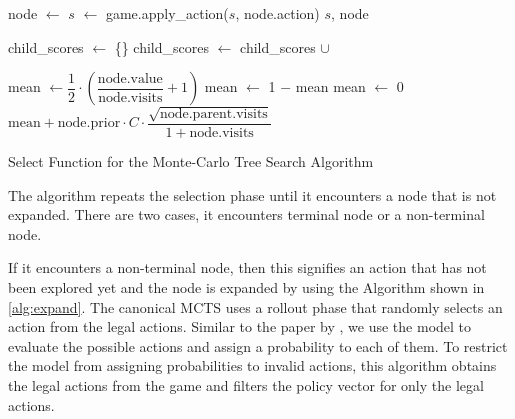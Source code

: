 \begin{algorithm}[H]
    \begin{algorithmic}[1]
                \State node $\gets$ 
                \State $s$ $\gets$ game.apply\_action($s$, node.action)
            \EndWhile
            \State \Return $s$, node
        \EndFunction
        
            \State child\_scores $\gets$ \{\}
                \State child\_scores $\gets$ child\_scores $\cup$ 
            \EndFor
            \Return {}
        \EndFunction
        
                \State mean $\gets \dfrac{1}{2}\cdot\left(\dfrac{ \text{node.value} }{ \text{node.visits} } + 1\right)$
                    \State mean $\gets$ 1 $-$ mean
                \EndIf
            \Else
                \State mean $\gets$ 0
            \EndIf
            \State \Return $\text{mean} + \text{node.prior} \cdot C \cdot \dfrac{\sqrt{\text{node.parent.visits}}}{1 + \text{node.visits}}$  
        \EndFunction
    \end{algorithmic}
    \caption{Select Function for the Monte-Carlo Tree Search Algorithm}
    \label{alg:select}
\end{algorithm}

The algorithm repeats the selection phase until it encounters a node that is not expanded. There are two cases, it encounters terminal node or a non-terminal node. 

If it encounters a non-terminal node, then this signifies an action that has not been explored yet and the node is expanded by using the Algorithm shown in \ref{alg:expand}. The canonical MCTS uses a rollout phase that randomly selects an action from the legal actions. Similar to the paper by \cite{silver2017masteringchessshogiselfplay}, we use the model to evaluate the possible actions and assign a probability to each of them. To restrict the model from assigning probabilities to invalid actions, this algorithm obtains the legal actions from the game and filters the policy vector for only the legal actions.

